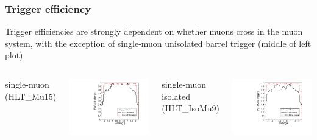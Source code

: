 \documentclass[compress]{beamer}
\begin{document}
\begin{frame}
\frametitle{Trigger efficiency}

Trigger efficiencies are strongly dependent on whether muons cross in
the muon system, with the exception of single-muon unisolated barrel
trigger (middle of left plot)

\vspace{0.5 cm}
\begin{columns}
\centering single-muon (HLT\_Mu15)

\includegraphics[width=\linewidth]{eta_mass5cut_triggerMu15_nosuppressedzero.pdf}

\centering single-muon isolated (HLT\_IsoMu9)

\includegraphics[width=\linewidth]{eta_mass5cut_triggerIsoMu9.pdf}


\end{columns}
\end{frame}
\end{document}

